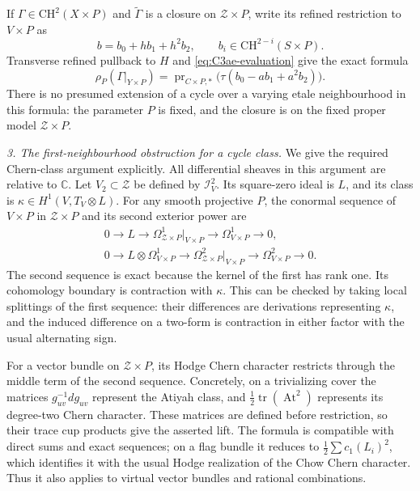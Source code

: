 If $\Gamma\in\mathrm{CH}^2(X\times P)$ and
$\widetilde\Gamma$ is a closure on $\mathcal Z\times P$,
write its refined restriction to $V\times P$ as
\[
 b=b_0+h b_1+h^2 b_2,
 \qquad b_i\in\mathrm{CH}^{2-i}(S\times P).
\]
Transverse refined pullback to $H$ and
\eqref{eq:C3ae-evaluation} give the exact formula
\begin{equation}\label{eq:C3ae-source-invariant}
 \rho_P(\Gamma|_{Y\times P})
   =\operatorname{pr}_{C\times P,*}
            \bigl(\tau(b_0-a b_1+a^2b_2)\bigr).
\end{equation}
There is no presumed extension of a cycle over a varying
etale neighbourhood in this formula: the parameter $P$
is fixed, and the closure is on the fixed proper model
$\mathcal Z\times P$.

\emph{3. The first-neighbourhood obstruction for a cycle class.}
We give the required Chern-class argument explicitly.
All differential sheaves in this argument are relative
to $\mathbb C$.
Let $V_2\subset\mathcal Z$ be defined by $\mathcal I_V^2$.
Its square-zero ideal is $L$, and its class is
$\kappa\in H^1(V,T_V\otimes L)$. For any smooth
projective $P$, the conormal sequence of $V\times P$
in $\mathcal Z\times P$ and its second exterior power are
\[
\begin{gathered}
 0\longrightarrow L\longrightarrow
 \Omega^1_{\mathcal Z\times P}|_{V\times P}
 \longrightarrow\Omega^1_{V\times P}\longrightarrow0,\\
 0\longrightarrow L\otimes\Omega^1_{V\times P}
 \longrightarrow\Omega^2_{\mathcal Z\times P}|_{V\times P}
 \longrightarrow\Omega^2_{V\times P}\longrightarrow0.
\end{gathered}
\]
The second sequence is exact because the kernel of
the first has rank one. Its cohomology boundary is
contraction with $\kappa$.
This can be checked by taking local splittings of the
first sequence: their differences are derivations
representing $\kappa$, and the induced difference on
a two-form is contraction in either factor with the
usual alternating sign.

For a vector bundle on $\mathcal Z\times P$, its Hodge
Chern character restricts through the middle term of
the second sequence. Concretely, on a trivializing cover
the matrices $g_{uv}^{-1}dg_{uv}$ represent the Atiyah
class, and $\tfrac12\operatorname{tr}(\operatorname{At}^2)$
represents its degree-two Chern character. These matrices
are defined before restriction, so their trace cup
products give the asserted lift. The formula is
compatible with direct sums and exact sequences; on a
flag bundle it reduces to $\tfrac12\sum c_1(L_i)^2$,
which identifies it with the usual Hodge realization
of the Chow Chern character. Thus it also applies to
virtual vector bundles and rational combinations.

